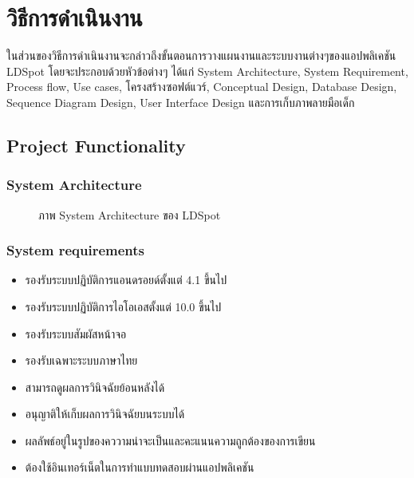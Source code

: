 \documentclass[12pt,oneside,openright,a4paper]{cpe-thai-project}
\begin{document}
\chapter{วิธีการดำเนินงาน}
ในส่วนของวิธีการดำเนินงานจะกล่าวถึงขั้นตอนการวางแผนงานและระบบงานต่างๆของแอปพลิเคชัน LDSpot โดยจะประกอบด้วยหัวข้อต่างๆ ได้แก่ System Architecture, System Requirement, Process flow, Use cases, โครงสร้างซอฟต์แวร์, Conceptual Design, Database Design, Sequence Diagram Design, User Interface Design และการเก็บภาพลายมือเด็ก
\section{Project Functionality}
\subsection{System Architecture}
\begin{figure}[!ht]\centering
  \setlength{\fboxrule}{0.2mm} %
  \setlength{\fboxsep}{1cm}
  \caption{ภาพ System Architecture ของ LDSpot}\label{fig:system}
\end{figure}
\subsection{System requirements}
\begin{itemize}
  \item รองรับระบบปฏิบัติการแอนดรอยด์ตั้งแต่ 4.1 ขึ้นไป
  \item รองรับระบบปฏิบัติการไอโอเอสตั้งแต่ 10.0 ขึ้นไป
  \item รองรับระบบสัมผัสหน้าจอ
  \item รองรับเฉพาะระบบภาษาไทย
  \item สามารถดูผลการวินิจฉัยย้อนหลังได้
  \item อนุญาติให้เก็บผลการวินิจฉัยบนระบบได้
  \item ผลลัพธ์อยู่ในรูปของคววามน่าจะเป็นและคะแนนความถูกต้องของการเขียน
  \item ต้องใช้อินเทอร์เน็ตในการทำแบบทดสอบผ่านแอปพลิเคชัน
\end{itemize}
\newpage
\end{document}
